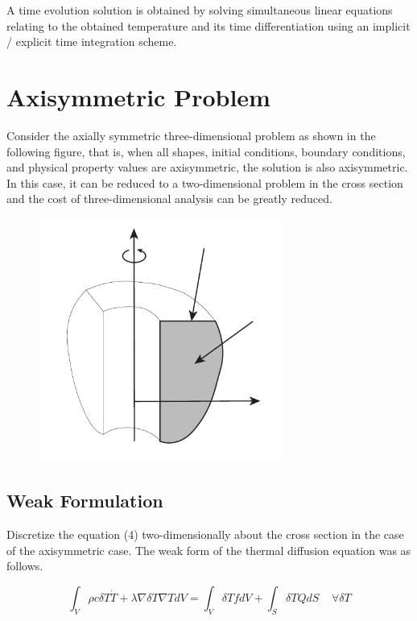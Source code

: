 A time evolution solution is obtained by solving simultaneous linear equations relating to the obtained temperature and its time differentiation using an implicit / explicit time integration scheme.




\section{Axisymmetric Problem}
Consider the axially symmetric three-dimensional problem as shown in the following figure, that is, when all shapes, initial conditions, boundary conditions, and physical property values ​​are axisymmetric, the solution is also axisymmetric. In this case, it can be reduced to a two-dimensional problem in the cross section and the cost of three-dimensional analysis can be greatly reduced.


\begin{figure}[hbtb!]
\center
\includegraphics[width=80mm]{images/cylinder_domain.pdf}
\end{figure}




\subsection{Weak Formulation}
%
Discretize the equation (4) two-dimensionally about the cross section in the case of the axisymmetric case. The weak form of the thermal diffusion equation was as follows.

\begin{equation}
\int_V \rho c \delta T\dot{T}  + \lambda\nabla\delta T\nabla TdV= \int_V \delta T f dV + \int_S  \delta T Q dS\;\;\;\;\forall\delta T
\end{equation}

